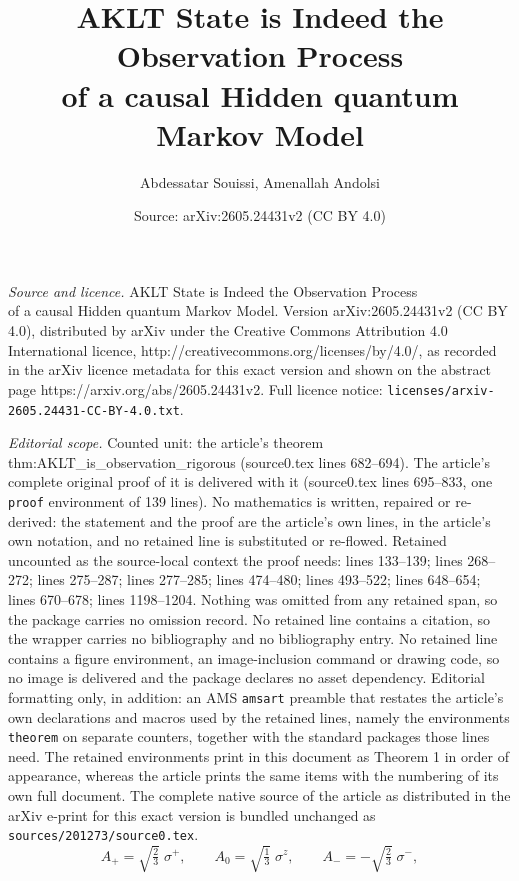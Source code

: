 \documentclass[10pt,a4paper]{amsart}
\title{AKLT State is Indeed the Observation Process \\ of a causal Hidden quantum Markov Model}
\author{Abdessatar Souissi, Amenallah Andolsi}
\date{Source: arXiv:2605.24431v2 (CC BY 4.0)}
\begin{document}
\maketitle

\noindent\emph{Source and licence.} AKLT State is Indeed the Observation Process \\ of a causal Hidden quantum Markov Model. Version arXiv:2605.24431v2 (CC BY 4.0), distributed by arXiv under the Creative Commons Attribution 4.0 International licence, http://creativecommons.org/licenses/by/4.0/, as recorded in the arXiv licence metadata for this exact version and shown on the abstract page https://arxiv.org/abs/2605.24431v2. Full licence notice: \texttt{licenses/arxiv-2605.24431-CC-BY-4.0.txt}.\par\smallskip

\noindent\textit{Editorial scope.} Counted unit: the article's theorem thm:AKLT\_is\_observation\_rigorous (source0.tex lines 682--694). The article's complete original proof of it is delivered with it (source0.tex lines 695--833, one \texttt{proof} environment of 139 lines). No mathematics is written, repaired or re-derived: the statement and the proof are the article's own lines, in the article's own notation, and no retained line is substituted or re-flowed.  Retained uncounted as the source-local context the proof needs: lines 133--139; lines 268--272; lines 275--287; lines 277--285; lines 474--480; lines 493--522; lines 648--654; lines 670--678; lines 1198--1204.  Nothing was omitted from any retained span, so the package carries no omission record.  No retained line contains a citation, so the wrapper carries no bibliography and no bibliography entry.  No retained line contains a figure environment, an image-inclusion command or drawing code, so no image is delivered and the package declares no asset dependency.  Editorial formatting only, in addition: an AMS \texttt{amsart} preamble that restates the article's own declarations and macros used by the retained lines, namely the environments \texttt{theorem} on separate counters, together with the standard packages those lines need.  The retained environments print in this document as Theorem 1 in order of appearance, whereas the article prints the same items with the numbering of its own full document.  The complete native source of the article as distributed in the arXiv e-print for this exact version is bundled unchanged as \texttt{sources/201273/source0.tex}.
\begin{equation}\label{eq:Ak}
A_{+} = \sqrt{\tfrac{2}{3}}\;\sigma^{+},
\qquad
A_{0} = \sqrt{\tfrac{1}{3}}\;\sigma^{z},
\qquad
A_{-} = -\sqrt{\tfrac{2}{3}}\;\sigma^{-},
\end{equation}
\end{document}
